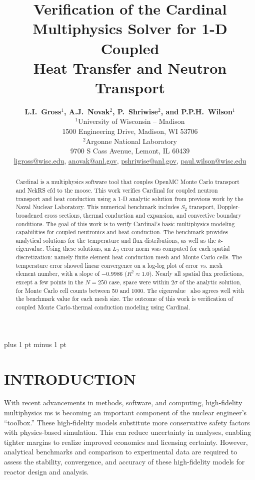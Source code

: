\documentclass[letterpaper]{mc2023}
\title{Verification of the Cardinal Multiphysics Solver for 1-D Coupled\\
Heat Transfer and Neutron Transport}
\author{%
  \textbf{L.I.~Gross$^1$, A.J.~Novak$^2$, P.~Shriwise$^2$, and P.P.H.~Wilson$^1$}\\
  $^1$University of Wisconsin -- Madison  \\
  1500 Engineering Drive, Madison, WI 53706 \vspace{6pt}\\
  $^2$Argonne National Laboratory \\
  9700 S Cass Avenue, Lemont, IL 60439\vspace{6pt} \\
  \url{ligross@wisc.edu}, \url{anovak@anl.gov}, \url{pshriwise@anl.gov}, \url{paul.wilson@wisc.edu}
}
\begin{document}
\maketitle
\justify
\parskip 6pt plus 1 pt minus 1 pt

\begin{abstract}
Cardinal is a multiphysics software tool that couples OpenMC Monte Carlo transport and NekRS \gls{cfd} to the \gls{moose}. This
work verifies Cardinal for coupled neutron transport and heat conduction using a 1-D analytic solution from previous work by the
Naval Nuclear Laboratory. This numerical benchmark includes $S_2$ transport, Doppler-broadened cross sections, thermal conduction
and expansion, and convective boundary conditions. The goal of this work is to verify Cardinal's basic multiphysics modeling
capabilities for coupled neutronics and heat conduction. The benchmark provides analytical solutions for the temperature and flux
distributions, as well as the $k$-eigenvalue. Using these solutions, an $L_{2}$ error norm was computed for each spatial discretization:
namely finite element heat conduction mesh and Monte Carlo cells. The temperature error showed linear convergence on a log-log plot of
error vs. mesh element number, with a slope of $-0.9986$ ($R^2\approx 1.0$). Nearly all spatial flux predictions, except a few points
in the $N=250$ case, space were within $2\sigma$ of the analytic solution, for Monte Carlo cell counts between 50 and 1000. The
eigenvalue \keff~also agrees well with the benchmark value for each mesh size. The outcome of this work is verification of coupled
Monte Carlo-thermal conduction modeling using Cardinal.
\end{abstract}
\vspace{6pt}

\section{INTRODUCTION}
\label{sec:intro}
With recent advancements in methods, software, and computing, high-fidelity multiphysics \gls{ms} is becoming an important
component of the nuclear engineer's ``toolbox.'' These high-fidelity models substitute more conservative safety factors
with physics-based simulation. This can reduce uncertainty in analyses, enabling tighter margins to realize improved economics
and licensing certainty. However, analytical benchmarks and comparison to experimental data are required to assess the stability,
convergence, and accuracy of these high-fidelity models for reactor design and analysis.
\end{document}
